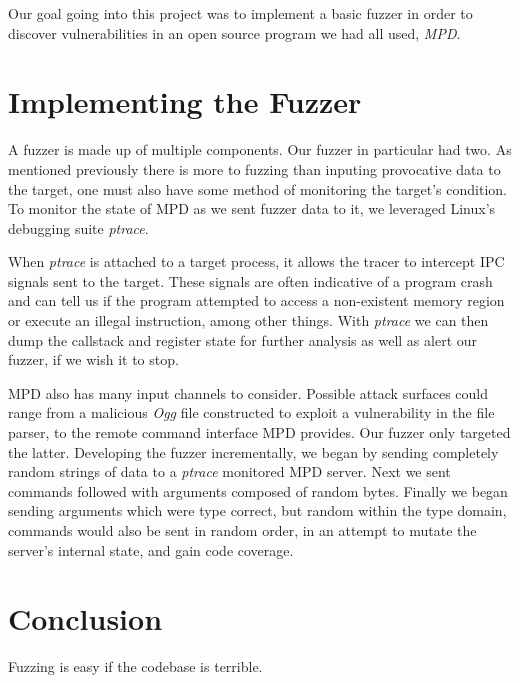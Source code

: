 \documentclass[10pt]{article}
\begin{document}
Our goal going into this project was to implement a basic fuzzer in order to discover vulnerabilities in an open source program we had all used, \emph{MPD}.
\section{Implementing the Fuzzer}
A fuzzer is made up of multiple components. Our fuzzer in particular had two. As mentioned previously there is more to fuzzing than inputing provocative data to the target, one must also have some method of monitoring the target's condition. To monitor the state of MPD as we sent fuzzer data to it, we leveraged Linux's debugging suite \emph{ptrace}. 

When \emph{ptrace} is attached to a target process, it allows the tracer to intercept IPC signals sent to the target. These signals are often indicative of a program crash and can tell us if the program attempted to access a non-existent memory region or execute an illegal instruction, among other things. With \emph{ptrace} we can then dump the callstack and register state for further analysis as well as alert our fuzzer, if we wish it to stop.

MPD also has many input channels to consider. Possible attack surfaces could range from a malicious \emph{Ogg} file constructed to exploit a vulnerability in the file parser, to the remote command interface MPD provides. Our fuzzer only targeted the latter. Developing the fuzzer incrementally, we began by sending completely random strings of data to a \emph{ptrace} monitored MPD server. Next we sent commands followed with arguments composed of random bytes. Finally we began sending arguments which were type correct, but random within the type domain, commands would also be sent in random order, in an attempt to mutate the server's internal state, and gain code coverage.

\section{Conclusion}
Fuzzing is easy if the codebase is terrible.
\end{document}
